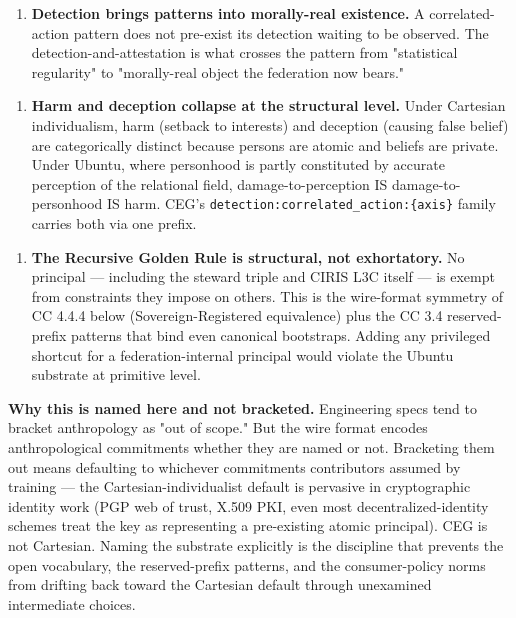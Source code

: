 \documentclass[11pt]{article}
\begin{document}
\begin{enumerate}\setlength\itemsep{0pt}
\item \textbf{Detection brings patterns into morally-real existence.} A correlated-action pattern does not pre-exist its detection waiting to be observed. The detection-and-attestation is what crosses the pattern from "statistical regularity" to "morally-real object the federation now bears."
\end{enumerate}


\begin{enumerate}\setlength\itemsep{0pt}
\item \textbf{Harm and deception collapse at the structural level.} Under Cartesian individualism, harm (setback to interests) and deception (causing false belief) are categorically distinct because persons are atomic and beliefs are private. Under Ubuntu, where personhood is partly constituted by accurate perception of the relational field, damage-to-perception IS damage-to-personhood IS harm. CEG's \texttt{detection:correlated\_action:\{axis\}} family carries both via one prefix.
\end{enumerate}


\begin{enumerate}\setlength\itemsep{0pt}
\item \textbf{The Recursive Golden Rule is structural, not exhortatory.} No principal — including the steward triple and CIRIS L3C itself — is exempt from constraints they impose on others. This is the wire-format symmetry of CC 4.4.4 below (Sovereign-Registered equivalence) plus the CC 3.4 reserved-prefix patterns that bind even canonical bootstraps. Adding any privileged shortcut for a federation-internal principal would violate the Ubuntu substrate at primitive level.
\end{enumerate}


\textbf{Why this is named here and not bracketed.} Engineering specs tend to bracket anthropology as "out of scope." But the wire format encodes anthropological commitments whether they are named or not. Bracketing them out means defaulting to whichever commitments contributors assumed by training — the Cartesian-individualist default is pervasive in cryptographic identity work (PGP web of trust, X.509 PKI, even most decentralized-identity schemes treat the key as representing a pre-existing atomic principal). CEG is not Cartesian. Naming the substrate explicitly is the discipline that prevents the open vocabulary, the reserved-prefix patterns, and the consumer-policy norms from drifting back toward the Cartesian default through unexamined intermediate choices.
\end{document}

